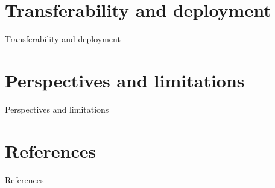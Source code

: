 \documentclass[aspectratio=169,xcolor=dvipsnames]{beamer}
\begin{document}
\section{Transferability and deployment}
\begin{frame}{Transferability and deployment}

\end{frame}

\section{Perspectives and limitations}
\begin{frame}{Perspectives and limitations}

\end{frame}

\section{References}
\begin{frame}{References}

    
    \cite{YUCESAN2023110921}
\end{frame}
\end{document}
